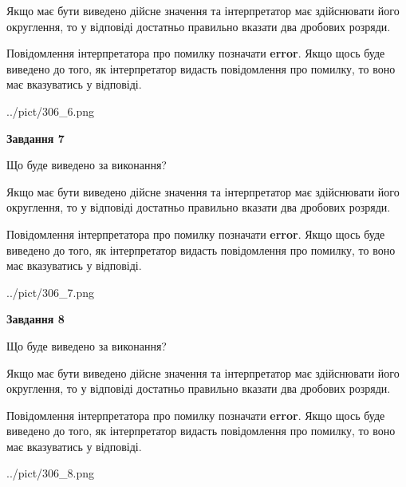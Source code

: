 \documentclass[12pt, ukrainian]{article}
\begin{document}
{\begin {Large}
Якщо має бути виведено дійсне значення та інтерпретатор має здійснювати його округлення, 
то у відповіді достатньо правильно вказати два дробових розряди.

Повідомлення інтерпретатора про помилку позначати \textbf{error}.
Якщо щось буде виведено до того, як інтерпретатор видасть повідомлення про помилку, 
то воно має вказуватись у відповіді. \par

\begin{center}
	{../pict/306_6.png}
\end{center}
\newpage

{\begin {center}\textbf{Завдання 7}\end {center}}\par
Що буде виведено за виконання? \par

Якщо має бути виведено дійсне значення та інтерпретатор має здійснювати його округлення, 
то у відповіді достатньо правильно вказати два дробових розряди.

Повідомлення інтерпретатора про помилку позначати \textbf{error}.
Якщо щось буде виведено до того, як інтерпретатор видасть повідомлення про помилку, 
то воно має вказуватись у відповіді. \par

\begin{center}
	{../pict/306_7.png}
\end{center}
\newpage

{\begin {center}\textbf{Завдання 8}\end {center}}\par
Що буде виведено за виконання? \par

Якщо має бути виведено дійсне значення та інтерпретатор має здійснювати його округлення, 
то у відповіді достатньо правильно вказати два дробових розряди.

Повідомлення інтерпретатора про помилку позначати \textbf{error}.
Якщо щось буде виведено до того, як інтерпретатор видасть повідомлення про помилку, 
то воно має вказуватись у відповіді. \par

\begin{center}
	{../pict/306_8.png}
\end{center}
\newpage


\end{Large}}
\end{document}
